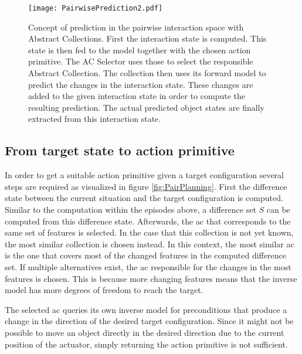 \begin{figure}
	\centering
	\texttt{[image: PairwisePrediction2.pdf]}
	\caption{Concept of prediction in the pairwise interaction space with Abstract Collections. First the interaction state is computed. This state is then fed to the model together with the chosen action primitive. The AC Selector uses those to select the responsible Abstract Collection. The collection then uses its forward model to predict the changes in the interaction state. These changes are added to the given interaction state in order to compute the resulting prediction. The actual predicted object states are finally extracted from this interaction state.} 
	\label{fig:PairPrediction}
\end{figure}

\subsection{From target state to action primitive \label{sec:pairPlanning}}


In order to get a suitable action primitive given a target configuration several steps are required as visualized in figure \ref{fig:PairPlanning}. 
First the difference state between the current situation and the target configuration is computed. Similar to the computation within the episodes above, a difference set $S$ can be computed from this difference state. Afterwards, the \gls{ac} that corresponds to the same set of features is selected. In the case that this collection is not yet known, the most similar collection is chosen instead. In this context, the most similar \gls{ac} is the one that covers most of the changed features in the computed difference set. If multiple alternatives exist, the \gls{ac} responsible for the changes in the most features is chosen. This is because more changing features means that the inverse model has more degrees of freedom to reach the target.

The selected \gls{ac} queries its own inverse model for preconditions that produce a change in the direction of the desired target configuration. 
Since it might not be possible to move an object directly in the desired direction due to the current position of the actuator, simply returning the action primitive is not sufficient.


